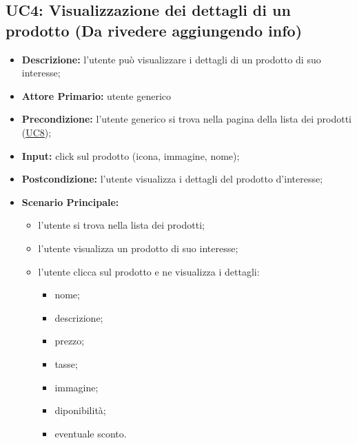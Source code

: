 \subsection{UC4: Visualizzazione dei dettagli di un prodotto (\textbf{Da rivedere aggiungendo info})}
\label{sec:UC4}
\begin{itemize}
    \item \textbf{Descrizione:} l'utente può visualizzare i dettagli di un prodotto di suo interesse;
    \item \textbf{Attore Primario:} utente generico
    \item \textbf{Precondizione:} l'utente generico si trova nella pagina della lista dei prodotti (\hyperref[sec:UC8]{\underline{UC8}});
    \item \textbf{Input:} click sul prodotto (icona, immagine, nome);
    \item \textbf{Postcondizione:} l'utente visualizza i dettagli del prodotto d'interesse;
    \item \textbf{Scenario Principale:}
          \begin{itemize}
              \item l'utente si trova nella lista dei prodotti;
              \item l'utente visualizza un prodotto di suo interesse;
              \item l'utente clicca sul prodotto e ne visualizza i dettagli:
                    \begin{itemize}
                        \item nome;
                        \item descrizione;
                        \item prezzo;
                        \item tasse;
                        \item immagine;
                        \item diponibilità;
                        \item eventuale sconto.
                    \end{itemize}
          \end{itemize}
\end{itemize}

